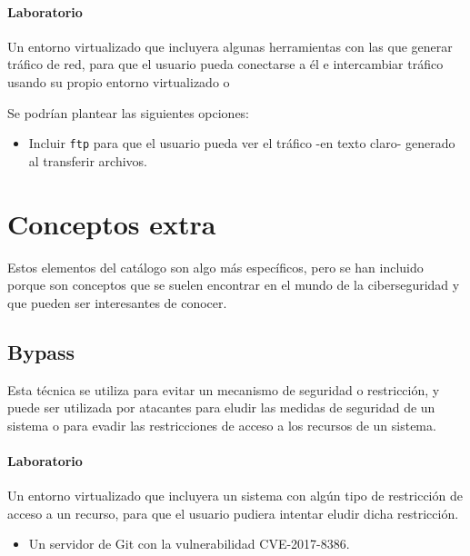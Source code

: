        \paragraph{Laboratorio}

            Un entorno virtualizado que incluyera algunas herramientas con las que generar tráfico de red, para que el usuario pueda conectarse a él e intercambiar tráfico usando su propio entorno virtualizado o

            Se podrían plantear las siguientes opciones:

            \begin{itemize}
                \item Incluir \texttt{ftp} para que el usuario pueda ver el tráfico -en texto claro- generado al transferir archivos.
            \end{itemize}


    \section{Conceptos extra}

        Estos elementos del catálogo son algo más específicos, pero se han incluido porque son conceptos que se suelen encontrar en el mundo de la ciberseguridad y que pueden ser interesantes de conocer.

        \subsection{Bypass}

            Esta técnica se utiliza para evitar un mecanismo de seguridad o restricción, y puede ser utilizada por atacantes para eludir las medidas de seguridad de un sistema o para evadir las restricciones de acceso a los recursos de un sistema.

            \paragraph{Laboratorio}

                Un entorno virtualizado que incluyera un sistema con algún tipo de restricción de acceso a un recurso, para que el usuario pudiera intentar eludir dicha restricción.

                \begin{itemize}
                    \item Un servidor de Git con la vulnerabilidad CVE-2017-8386.
                \end{itemize}



